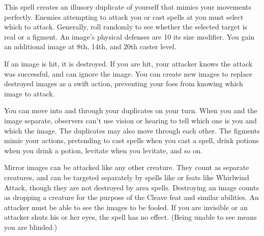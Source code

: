 \spelldur{\durshort \dismissable}
\spelleffect This spell creates an illusory duplicate of yourself that mimics your movements perfectly. Enemies attempting to attack you or cast spells at you must select which to attack. Generally, roll randomly to see whether the selected target is real or a figment. An image's physical defenses are 10 \add its size modifier. You gain an additional image at 8th, 14th, and 20th caster level. 
\par If an image is hit, it is destroyed. If you are hit, your attacker knows the attack was successful, and can ignore the image. You can create new images to replace destroyed images as a swift action, preventing your foes from knowing which image to attack.
\par You can move into and through your duplicates on your turn. When you and the image separate, observers can't use vision or hearing to tell which one is you and which the image. The duplicates may also move through each other. The figments mimic your actions, pretending to cast spells when you cast a spell, drink potions when you drink a potion, levitate when you levitate, and so on.
\par Mirror images can be attacked like any other creature. They count as separate creatures, and can be targeted separately by spells like  or feats like Whirlwind Attack, though they are not destroyed by area spells. Destroying an image counts as dropping a creature for the purpose of the Cleave feat and similar abilities.
\spellnotes An attacker must be able to see the images to be fooled. If you are invisible or an attacker shuts his or her eyes, the spell has no effect. (Being unable to see means you are blinded.)

